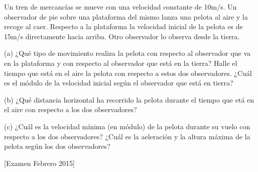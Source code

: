 \begin{ex}
    Un tren de mercancías se mueve con una velocidad constante de 10m/s. Un observador de pie sobre una plataforma del mismo lanza una pelota al aire y la recoge al caer. Respecto a la plataforma la velocidad inicial de la pelota es de 15m/s directamente hacia arriba. Otro observador lo observa desde la tierra.

    (a) ¿Qué tipo de movimiento realiza la pelota con respecto al observador que va en la plataforma y con respecto al observador que está en la tierra? Halle el tiempo que está en el aire la pelota con respecto a estos dos observadores. ¿Cuál es el módulo de la velocidad inicial según el observador que está en tierra?

    (b) ¿Qué distancia horizontal ha recorrido la pelota durante el tiempo que etá en el aire con respecto a los dos observadores?

    (c) ¿Cuál es la velocidad mínima (en módulo) de la pelota durante su vuelo con respecto a los dos observadores? ¿Cuál es la aeleración y la altura máxima de la pelota según los dos observadores?

    [Examen Febrero 2015]
\end{ex}

